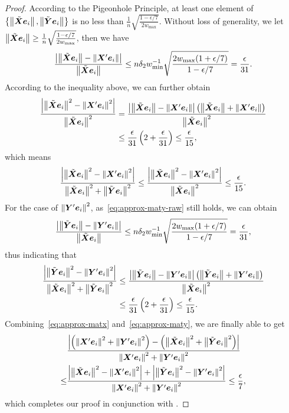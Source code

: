 \documentclass[sigconf]{acmart}
\begin{document}
\begin{proof}
  According to the Pigeonhole Principle, at least one element of \(\setof{\Abs{\tilde{\matx}\vece_i},\Abs{\tilde{\maty}\vece_i}}\) is no less than \(\frac{1}{n}\sqrt{\frac{1-\epsilon/7}{2w_{\max}}}\).
  Without loss of generality, we let \(\Abs{\tilde{\matx}\vece_i}\ge\frac{1}{n}\sqrt{\frac{1-\epsilon/7}{2w_{\max}}}\), then we have
  \[\frac{\abs{\Abs{\tilde{\matx}\vece_i}-\Abs{\matx'\vece_i}}}{\Abs{\tilde{\matx}\vece_i}}\le n\delta_2w_{\min}^{-1}\sqrt{\frac{2w_{\max}(1+\epsilon/7)}{1-\epsilon/7}}=\frac{\epsilon}{31}.\]
  According to the inequality above, we can further obtain
  \begin{align*}
    \frac{\abs{\Abs{\tilde{\matx}\vece_i}^2-\Abs{\matx'\vece_i}^2}}{\Abs{\tilde{\matx}\vece_i}^2} & =\frac{\abs{\Abs{\tilde{\matx}\vece_i}-\Abs{\matx'\vece_i}}\mypar{\Abs{\tilde{\matx}\vece_i}+\Abs{\matx'\vece_i}}}{\Abs{\tilde{\matx}\vece_i}^2} \\
                                                                                                  & \le\frac{\epsilon}{31}\mypar{2+\frac{\epsilon}{31}}\le\frac{\epsilon}{15},
  \end{align*}
  which means
  \begin{equation}\label{eq:approx-matx}
    \frac{\abs{\Abs{\tilde{\matx}\vece_i}^2-\Abs{\matx'\vece_i}^2}}{\Abs{\tilde{\matx}\vece_i}^2+\Abs{\tilde{\maty}\vece_i}^2}\le\frac{\abs{\Abs{\tilde{\matx}\vece_i}^2-\Abs{\matx'\vece_i}^2}}{\Abs{\tilde{\matx}\vece_i}^2}\le\frac{\epsilon}{15}.
  \end{equation}
  For the case of \(\Abs{\maty'\vece_i}^2\), as~\eqref{eq:approx-maty-raw} still holds, we can obtain
  \[\frac{\abs{\Abs{\tilde{\maty}\vece_i}-\Abs{\maty'\vece_i}}}{\Abs{\tilde{\matx}\vece_i}}\le n\delta_2w_{\min}^{-1}\sqrt{\frac{2w_{\max}(1+\epsilon/7)}{1-\epsilon/7}}=\frac{\epsilon}{31},\]
  thus indicating that
  \begin{equation}\label{eq:approx-maty}
    \begin{split}
      \frac{\abs{\Abs{\tilde{\maty}\vece_i}^2-\Abs{\maty'\vece_i}^2}}{\Abs{\tilde{\matx}\vece_i}^2+\Abs{\tilde{\maty}\vece_i}^2}&\le\frac{\abs{\Abs{\tilde{\maty}\vece_i}-\Abs{\maty'\vece_i}}\mypar{\Abs{\tilde{\maty}\vece_i}+\Abs{\maty'\vece_i}}}{\Abs{\tilde{\matx}\vece_i}^2}\\
      &\le\frac{\epsilon}{31}\mypar{2+\frac{\epsilon}{31}}\le\frac{\epsilon}{15}.
    \end{split}
  \end{equation}
  Combining~\eqref{eq:approx-matx} and~\eqref{eq:approx-maty}, we are finally able to get
  \begin{align*}
        & \frac{\abs{\mypar{\Abs{\matx'\vece_i}^2+\Abs{\maty'\vece_i}^2}-\mypar{\Abs{\tilde{\matx}\vece_i}^2+\Abs{\tilde{\maty}\vece_i}^2}}}{\Abs{\matx'\vece_i}^2+\Abs{\maty'\vece_i}^2}             \\
    \le & \frac{\abs{\Abs{\tilde{\matx}\vece_i}^2-\Abs{\matx'\vece_i}^2}+\abs{\Abs{\tilde{\maty}\vece_i}^2-\Abs{\maty'\vece_i}^2}}{\Abs{\matx'\vece_i}^2+\Abs{\maty'\vece_i}^2}\le\frac{\epsilon}{7},
  \end{align*}
  which completes our proof in conjunction with .
\end{proof}
\end{document}
